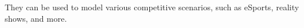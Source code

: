 \documentclass[preview]{standalone}
\begin{document}
They can be used to model various competitive scenarios, such as eSports, reality shows, and more.\\
\end{document}
